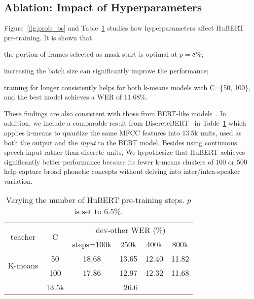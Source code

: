\subsection{Ablation: Impact of Hyperparameters}
Figure~\ref{fig:prob_bs} and Table~\ref{tab:step} studies how hyperparameters affect HuBERT pre-training.
It is shown that
\begin{enumerate*}[label=(\arabic*)]
    \item the portion of frames selected as mask start is optimal at $p=$8\%;
    \item increasing the batch size can significantly improve the performance; \item training for longer consistently helps for both k-means models with C=\{50, 100\}, and the best model achieves a WER of 11.68\%.
\end{enumerate*}
These findings are also consistent with those from BERT-like models~\cite{clark2020electra}. In addition, we include a comparable result from DiscreteBERT~\cite{baevski2019effectiveness} in Table~\ref{tab:step} which applies k-means to quantize the same MFCC features into 13.5k units, used as both the output and the \textit{input} to the BERT model. Besides using continuous speech input rather than discrete units, We hypothesize that HuBERT achieves significantly better performance because its fewer k-means clusters of 100 or 500 help capture broad phonetic concepts without delving into inter/intra-speaker variation. 

\begin{table}[ht]
    \centering
    \begin{tabular}{cc|cccc}
    \toprule
    \multirow{2}{*}{teacher} & \multirow{2}{*}{C} &  
    \multicolumn{4}{c}{dev-other WER (\%)} \\
    & & steps=100k & 250k & 400k & 800k \\
    \midrule
    \multirow{2}{*}{K-means}  
    & 50  & 18.68 & 13.65 & 12.40 & 11.82 \\
    & 100 & 17.86 & 12.97 & 12.32 & 11.68 \\
    \midrule
    \cite{baevski2019effectiveness} & 13.5k & \multicolumn{4}{c}{26.6} \\
    \bottomrule
\end{tabular}     \caption{Varying the number of HuBERT pre-training steps. $p$ is set to 6.5\%.}
    \label{tab:step}
\end{table}

